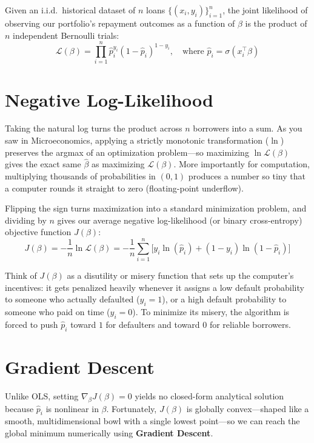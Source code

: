 \documentclass[12pt]{article}
\begin{document}
Given an i.i.d.\ historical dataset of $n$ loans $\{(x_i, y_i)\}_{i=1}^n$, the
joint likelihood of observing our portfolio's repayment outcomes as a function
of $\beta$ is the product of $n$ independent Bernoulli trials:
\begin{equation}
    \mathcal{L}(\beta) = \prod_{i=1}^n \hat{p}_i^{y_i} (1 - \hat{p}_i)^{1 - y_i},
    \quad \text{where } \hat{p}_i = \sigma(x_i^\top \beta)
\end{equation}

\section{Negative Log-Likelihood}

Taking the natural log turns the product across $n$ borrowers into a sum. As
you saw in Microeconomics, applying a strictly monotonic transformation ($\ln$)
preserves the argmax of an optimization problem---so maximizing
$\ln \mathcal{L}(\beta)$ gives the exact same $\hat{\beta}$ as maximizing
$\mathcal{L}(\beta)$. More importantly for computation, multiplying thousands
of probabilities in $(0, 1)$ produces a number so tiny that a computer rounds
it straight to zero (floating-point underflow).

Flipping the sign turns maximization into a standard minimization problem, and
dividing by $n$ gives our average negative log-likelihood (or binary
cross-entropy) objective function $J(\beta)$:
\begin{equation}
    J(\beta) = -\frac{1}{n} \ln \mathcal{L}(\beta)
             = -\frac{1}{n} \sum_{i=1}^n
               \Big[ y_i \ln(\hat{p}_i) + (1 - y_i) \ln(1 - \hat{p}_i) \Big]
\end{equation}

Think of $J(\beta)$ as a disutility or misery function that sets up the
computer's incentives: it gets penalized heavily whenever it assigns a low
default probability to someone who actually defaulted ($y_i = 1$), or a high
default probability to someone who paid on time ($y_i = 0$). To minimize its
misery, the algorithm is forced to push $\hat{p}_i$ toward $1$ for defaulters
and toward $0$ for reliable borrowers.

\section{Gradient Descent}

Unlike OLS, setting $\nabla_\beta J(\beta) = 0$ yields no closed-form
analytical solution because $\hat{p}_i$ is nonlinear in $\beta$. Fortunately,
$J(\beta)$ is globally convex---shaped like a smooth, multidimensional bowl
with a single lowest point---so we can reach the global minimum numerically
using \textbf{Gradient Descent}.
\end{document}

